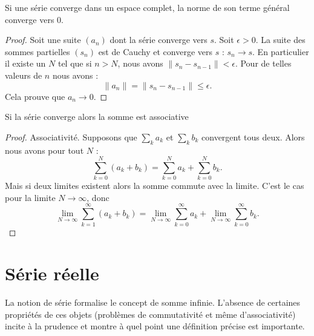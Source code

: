 \begin{proposition}  \label{PROPooYDFUooTGnYQg} 
    Si une série converge dans un espace complet, la norme de son terme général converge vers $0$.
\end{proposition}

\begin{proof}
    Soit une suite \( (a_n)\) dont la série converge vers \( s\). Soit \( \epsilon>0\). La suite des sommes partielles \( (s_n)\) est de Cauchy et converge vers \( s\) : \( s_n\to s\). En particulier il existe un \( N\) tel que si \( n>N\), nous avons \( \| s_n-s_{n-1} \|<\epsilon\). Pour de telles valeurs de \( n\) nous avons :
    \begin{equation}
        \| a_n \|=\| s_n-s_{n-1} \|\leq \epsilon.
    \end{equation}
    Cela prouve que \( a_n\to 0\).
\end{proof}

\begin{proposition}
    Si la série converge alors la somme est associative
\end{proposition}

\begin{proof}
    Associativité. Supposons que \( \sum_ka_k\) et \( \sum_kb_k\) convergent tous deux. Alors nous avons pour tout \( N\) :
    \begin{equation} 
        \sum_{k=0}^N(a_k+b_k)=\sum_{k=0}^Na_k+\sum_{k=0}^Nb_k.
    \end{equation}
    Mais si deux limites existent alors la somme commute avec la limite. C'est le cas pour la limite \( N\to \infty\), donc
    \begin{equation}
        \lim_{N\to \infty} \sum_{k=1}^{\infty}(a_k+b_k)=\lim_{N\to \infty} \sum_{k=0}^{\infty}a_k+\lim_{N\to \infty} \sum_{k=0}^{\infty}b_k.
    \end{equation}
\end{proof}

\section{Série réelle}
\label{secseries}

La notion de série formalise le concept de somme infinie. L'absence de certaines propriétés de ces objets (problèmes de commutativité et même d'associativité) incite à la prudence et montre à quel point une définition précise est importante. 


